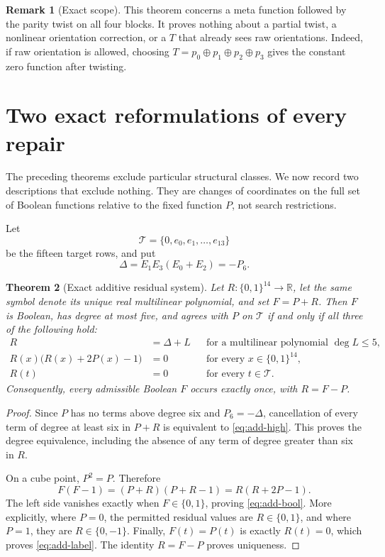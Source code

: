 \documentclass[11pt]{article}
\newtheorem{theorem}{Theorem}[section]
\theoremstyle{definition}
\newtheorem{remark}[theorem]{Remark}
\newcommand{\cube}[1]{\{0,1\}^{#1}}
\begin{document}
\begin{remark}[Exact scope]
This theorem concerns a meta function followed by the parity twist on all four
blocks.  It proves nothing about a partial twist, a nonlinear orientation
correction, or a \(T\) that already sees raw orientations.  Indeed, if raw
orientation is allowed, choosing \(T=p_0\oplus p_1\oplus p_2\oplus p_3\)
gives the constant zero function after twisting.
\end{remark}

\section{Two exact reformulations of every repair}\label{sec:exact-systems}

The preceding theorems exclude particular structural classes.  We now record
two descriptions that exclude nothing.  They are changes of coordinates on
the full set of Boolean functions relative to the fixed function \(P\), not
search restrictions.

Let
\[
 \mathcal T=\{0,e_0,e_1,\ldots,e_{13}\}
\]
be the fifteen target rows, and put
\[
 \Delta=E_1E_3(E_0+E_2)=-P_6.
\]

\begin{theorem}[Exact additive residual system]\label{thm:additive}
Let \(R:\cube{14}\to\mathbb R\), let the same symbol denote its unique real
multilinear polynomial, and set \(F=P+R\).  Then \(F\) is Boolean, has degree
at most five, and agrees with \(P\) on \(\mathcal T\) if and only if all three
of the following hold:
\begin{align}
 R&=\Delta+L &&\text{for a multilinear polynomial }\deg L\le5,
                                                        \label{eq:add-high}\\
 R(x)\bigl(R(x)+2P(x)-1\bigr)&=0
       &&\text{for every }x\in\cube{14},                 \label{eq:add-bool}\\
 R(t)&=0 &&\text{for every }t\in\mathcal T.              \label{eq:add-label}
\end{align}
Consequently, every admissible Boolean \(F\) occurs exactly once, with
\(R=F-P\).
\end{theorem}

\begin{proof}
Since \(P\) has no terms above degree six and \(P_6=-\Delta\), cancellation
of every term of degree at least six in \(P+R\) is equivalent to
\cref{eq:add-high}.  This proves the degree equivalence, including the absence
of any term of degree greater than six in \(R\).

On a cube point, \(P^2=P\).  Therefore
\[
 F(F-1)=(P+R)(P+R-1)=R(R+2P-1).
\]
The left side vanishes exactly when \(F\in\{0,1\}\), proving
\cref{eq:add-bool}.  More explicitly, where \(P=0\), the permitted residual
values are \(R\in\{0,1\}\), and where \(P=1\), they are
\(R\in\{0,-1\}\).  Finally, \(F(t)=P(t)\) is exactly \(R(t)=0\), which proves
\cref{eq:add-label}.  The identity \(R=F-P\) proves uniqueness.
\end{proof}
\end{document}
